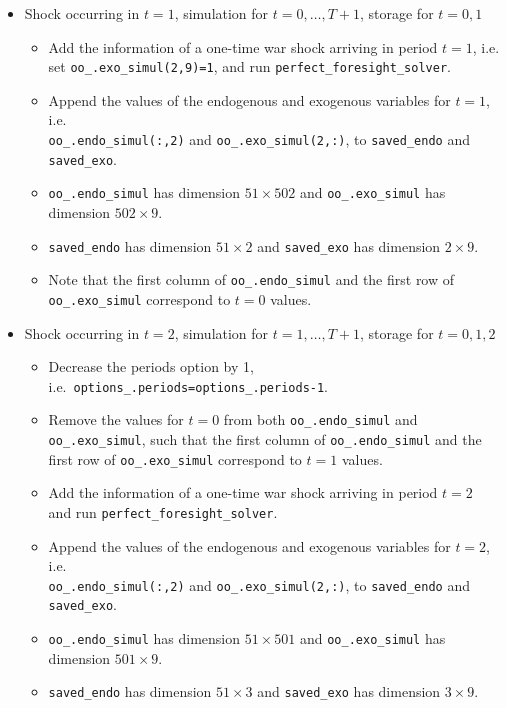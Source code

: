 \documentclass[a4paper]{scrartcl}
\begin{document}
\begin{enumerate}
\begin{itemize}
  \item
  Shock occurring in \(t=1\), simulation for \(t=0,\ldots ,T+1\), storage for \(t=0,1\)
  \begin{itemize}
    \item
    Add the information of a one-time war shock arriving in period \(t=1\), i.e.\\
      set \texttt{oo{\_}.exo{\_}simul{(2,9)}=1}, and run \texttt{perfect{\_}foresight{\_}solver}.
    \item
    Append the values of the endogenous and exogenous variables for \(t=1\), i.e.\\
      \texttt{oo{\_}.endo{\_}simul{(:,2)}} and \texttt{oo{\_}.exo{\_}simul{(2,:)}},
      to \texttt{saved{\_}endo} and \texttt{saved{\_}exo}.
    \item
    \texttt{oo{\_}.endo{\_}simul} has dimension \(51 \times 502\) and
    \texttt{oo{\_}.exo{\_}simul} has dimension \(502 \times 9\).
    \item
    \texttt{saved{\_}endo} has dimension \(51 \times 2\) and
    \texttt{saved{\_}exo} has dimension \(2 \times 9\).
    \item
    Note that the first column of \texttt{oo{\_}.endo{\_}simul}
      and the first row of \texttt{oo{\_}.exo{\_}simul} correspond to \(t=0\) values.
  \end{itemize}
    
  \item
  Shock occurring in \(t=2\), simulation for \(t=1,\ldots ,T+1\), storage for \(t=0,1,2\)
  \begin{itemize}
    \item
    Decrease the periods option by 1, i.e.\ \texttt{options{\_}.periods=options{\_}.periods-1}.
    \item
    Remove the values for \(t=0\) from both \texttt{oo{\_}.endo{\_}simul} and \texttt{oo{\_}.exo{\_}simul},
      such that the first column of \texttt{oo{\_}.endo{\_}simul}
      and the first row of \texttt{oo{\_}.exo{\_}simul} correspond to \(t=1\) values.
    \item
    Add the information of a one-time war shock arriving in period \(t=2\) \\
     and run \texttt{perfect{\_}foresight{\_}solver}.
    \item
    Append the values of the endogenous and exogenous variables for \(t=2\), i.e.\\
      \texttt{oo{\_}.endo{\_}simul{(:,2)}} and \texttt{oo{\_}.exo{\_}simul{(2,:)}},
      to \texttt{saved{\_}endo} and \texttt{saved{\_}exo}.
    \item
    \texttt{oo{\_}.endo{\_}simul} has dimension \(51 \times 501\) and
    \texttt{oo{\_}.exo{\_}simul} has dimension \(501 \times 9\).
    \item \texttt{saved{\_}endo} has dimension \(51 \times 3\) and
    \texttt{saved{\_}exo} has dimension \(3 \times 9\).
  \end{itemize}


\end{itemize}
\end{enumerate}
\end{document}
